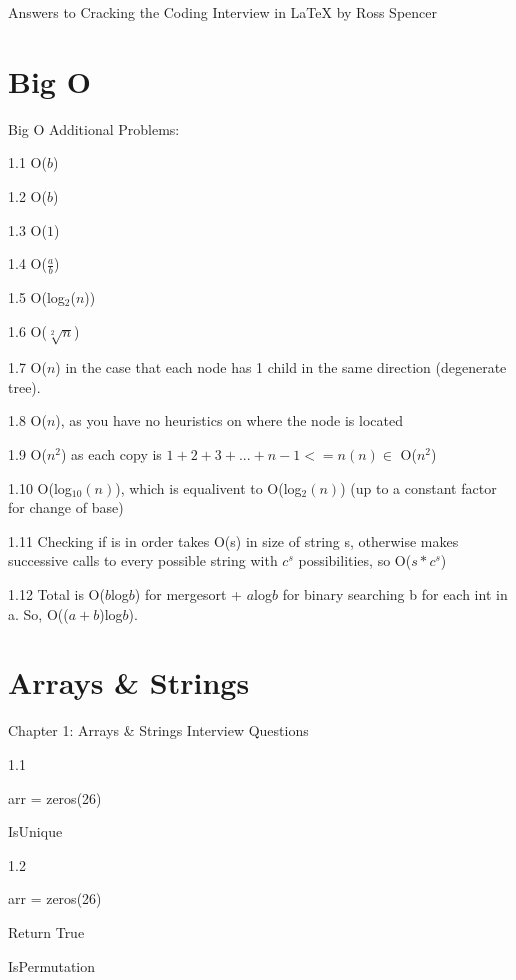 \documentclass{article}
\begin{document}
Answers to Cracking the Coding Interview in \LaTeX
by Ross Spencer


\section{Big O}
Big O Additional Problems:

1.1 O($b$)

1.2 O($b$)

1.3 O($1$)

1.4 O($\frac{a}{b}$)

1.5 O(log$_2$($n$))

1.6 O($\sqrt[2]{n}$)

1.7 O($n$) in the case that each node has 1 child in the same direction (degenerate tree).

1.8 O($n$), as you have no heuristics on where the node is located

1.9 O($n^2$) as each copy is $1+2+3+...+n-1 <= n(n) \in$ O($n^2$)

1.10 O(log$_10(n)$), which is equalivent to O(log$_2(n)$) (up to a constant factor for change of base)

1.11 Checking if is in order takes O(s) in size of string s, otherwise makes successive calls to every possible string with $c^s$ possibilities, so O($s*c^s$)

1.12 Total is O($b$log$b$) for mergesort + $a$log$b$ for binary searching b for each int in a. So, O(($a+b$)log$b$).


\pagebreak

\section{Arrays \& Strings}
Chapter 1: Arrays \& Strings
Interview Questions


1.1 
\begin{algorithm}
arr = zeros(26)\;
 \caption{IsUnique}

\end{algorithm}

1.2
\begin{algorithm}
arr = zeros(26)\;



 Return True\;
 
 \caption{IsPermutation}

\end{algorithm}
\end{document}
